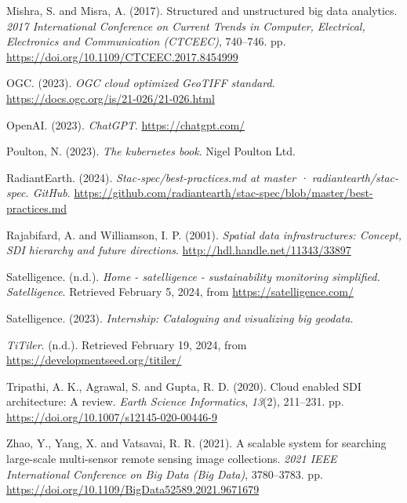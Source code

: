 \documentclass[
  oneside,
  open=any]{scrbook}
\newlength{\cslhangindent}
\newenvironment{CSLReferences}[2] %
 {\begin{list}{}{%
  \setlength{\itemindent}{0pt}
  \setlength{\leftmargin}{0pt}
  \setlength{\parsep}{0pt}
  \ifodd #1
   \setlength{\leftmargin}{\cslhangindent}
   \setlength{\itemindent}{-1\cslhangindent}
  \fi
  \setlength{\itemsep}{#2\baselineskip}}}
 {\end{list}}
\begin{document}
\begin{CSLReferences}{1}{0}
Mishra, S. and Misra, A. (2017). Structured and unstructured big data
analytics. \emph{2017 International Conference on Current Trends in
Computer, Electrical, Electronics and Communication ({CTCEEC})},
740--746. pp. \url{https://doi.org/10.1109/CTCEEC.2017.8454999}

OGC. (2023). \emph{{OGC} cloud optimized {GeoTIFF} standard}.
\url{https://docs.ogc.org/is/21-026/21-026.html}

OpenAI. (2023). \emph{{ChatGPT}}. \url{https://chatgpt.com/}

Poulton, N. (2023). \emph{The kubernetes book}. Nigel Poulton Ltd.

RadiantEarth. (2024). \emph{Stac-spec/best-practices.md at master ·
radiantearth/stac-spec. {GitHub}}.
\url{https://github.com/radiantearth/stac-spec/blob/master/best-practices.md}

Rajabifard, A. and Williamson, I. P. (2001). \emph{Spatial data
infrastructures: Concept, {SDI} hierarchy and future directions}.
\url{http://hdl.handle.net/11343/33897}

Satelligence. (n.d.). \emph{Home - satelligence - sustainability
monitoring simplified. Satelligence}. Retrieved February 5, 2024, from
\url{https://satelligence.com/}

Satelligence. (2023). \emph{Internship: Cataloguing and visualizing big
geodata}.

\emph{{TiTiler}}. (n.d.). Retrieved February 19, 2024, from
\url{https://developmentseed.org/titiler/}

Tripathi, A. K., Agrawal, S. and Gupta, R. D. (2020). Cloud enabled
{SDI} architecture: A review. \emph{Earth Science Informatics},
\emph{13}(2), 211--231. pp.
\url{https://doi.org/10.1007/s12145-020-00446-9}

Zhao, Y., Yang, X. and Vatsavai, R. R. (2021). A scalable system for
searching large-scale multi-sensor remote sensing image collections.
\emph{2021 {IEEE} International Conference on Big Data (Big Data)},
3780--3783. pp. \url{https://doi.org/10.1109/BigData52589.2021.9671679}

\end{CSLReferences}
\end{document}
